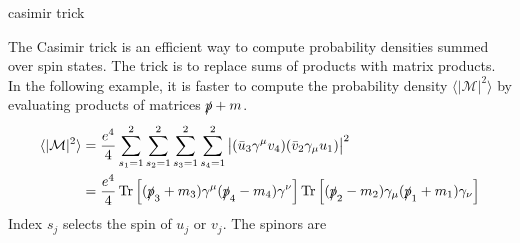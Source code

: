 \documentclass[12pt]{article}
\begin{document}
\begin{center}
{\sc casimir trick}
\end{center}

\noindent
The Casimir trick is an efficient way to compute probability densities summed over spin states.
The trick is to replace sums of products with matrix products.
In the following example, it is faster to compute the probability density $\langle|\mathcal{M}|^2\rangle$
by evaluating products of matrices $\slashed{p}+m$.
\begin{align*}
\langle|\mathcal{M}|^2\rangle
&=
\frac{e^4}{4}\sum_{s_1=1}^2\sum_{s_2=1}^2\sum_{s_3=1}^2\sum_{s_4=1}^2
\big|(\bar{u}_3\gamma^\mu v_4)(\bar{v}_2\gamma_\mu u_1)\big|^2\\
&=
\frac{e^4}{4}
\mathop{\rm Tr}\left[(\slashed{p}_3+m_3)\gamma^\mu(\slashed{p}_4-m_4)\gamma^\nu\right]
\mathop{\rm Tr}\left[(\slashed{p}_2-m_2)\gamma_\mu(\slashed{p}_1+m_1)\gamma_\nu\right]
\end{align*}
Index $s_j$ selects the spin of $u_j$ or $v_j$.
The spinors are
\end{document}
